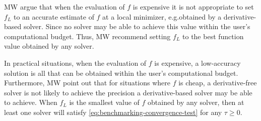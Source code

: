

\noindent MW argue that when the evaluation of $f$ is expensive it is not appropriate to set $f_L$
to an accurate estimate of $f$ at a local minimizer, e.g.obtained by a derivative-based solver.
Since no solver may be able to achieve this value within the user's computational budget.
Thus, MW recommend setting $f_L$ to the best function value obtained by any solver.


\noindent In practical situations, when
the evaluation of $f$ is expensive, a low-accuracy solution is all that can be obtained within
the user's computational budget.
Furthermore, MW point out that for situations where $f$ is cheap, a derivative-free solver is not likely to achieve the precision a derivative-based solver may be able to achieve.
When $f_L$ is the smallest value of $f$ obtained by any solver, then at least one solver will satisfy \ref{eq:benchmarking-convergence-test} for any $\tau \geq 0$.





